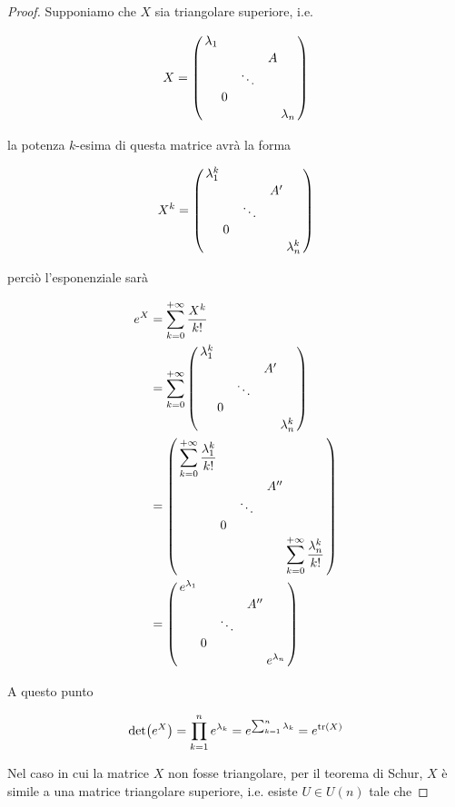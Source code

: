 \begin{proof}
	Supponiamo che $ X $ sia triangolare superiore, i.e.
	
	\begin{equation}
		X = %
		\smqty(\dmat{ \lambda_{1}, %
						& & A \\ %
						& \ddots & \\ %
						0 & & , %
						\lambda_{n} })
	\end{equation}

	la potenza $ k $-esima di questa matrice avrà la forma
	
	\begin{equation}
		X^{k} = %
		\smqty(\dmat{ \lambda_{1}^{k}, %
						& & A' \\ %
						& \ddots & \\ %
						0 & & , %
						\lambda_{n}^{k} })
	\end{equation}

	perciò l'esponenziale sarà
	
	\begin{align}
		\begin{split}
			e^{X} &= \sum_{k=0}^{+\infty} \dfrac{X^{k}}{k!}\\
			&= \sum_{k=0}^{+\infty} %
				\smqty(\dmat{ \lambda_{1}^{k}, %
								& & A' \\ %
								& \ddots & \\ %
								0 & & , %
								\lambda_{n}^{k} })\\
			&= \smqty(\dmat{ \displaystyle\sum_{k=0}^{+\infty} \dfrac{\lambda_{1}^{k}}{k!}, %
								& & A'' \\ %
								& \ddots & \\ %
								0 & & , %
								\displaystyle\sum_{k=0}^{+\infty} \dfrac{\lambda_{n}^{k}}{k!} })\\
			&= \smqty(\dmat{ e^{\lambda_{1}}, %
								& & A'' \\ %
								& \ddots & \\ %
								0 & & , %
								e^{\lambda_{n}} })
		\end{split}
	\end{align}

	A questo punto
	
	\begin{equation}
		\det(e^{X}) = \prod_{k=1}^{n} e^{\lambda_{k}} = e^{\sum_{k=1}^{n} \lambda_{k}} = e^{\tr(X)}
	\end{equation}

	Nel caso in cui la matrice $ X $ non fosse triangolare, per il teorema di Schur, $ X $ è simile a una matrice triangolare superiore, i.e. esiste $ U \in U(n) $ tale che
	

\end{proof}
